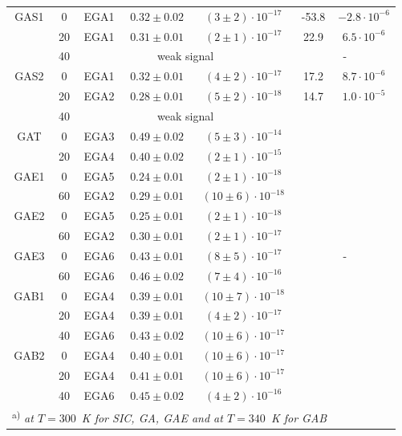 \documentclass[final,3p,times,twocolumn,authoryear]{elsarticle}
\begin{document}
\begin{table}
\begin{tabular}{ccccccc}
GAS1& 0 &EGA1& $0.32\pm0.02$ &$(3\pm2)\cdot10^{-17}$&-53.8&$-2.8\cdot10^{-6}$\\ %
& 20 &EGA1& $0.31\pm0.01$ &$(2\pm1)\cdot10^{-17}$&22.9&$6.5\cdot10^{-6}$\\ %
& 40 & \multicolumn{3}{c}{weak signal}&\multicolumn{2}{c}{-}\\ %
GAS2& 0 &EGA1& $0.32\pm0.01$ &$(4\pm2)\cdot10^{-17}$&17.2&$8.7\cdot10^{-6}$\\ %
& 20 &EGA2& $0.28\pm0.01$ &$(5\pm2)\cdot10^{-18}$&14.7&$1.0\cdot10^{-5}$\\ %
& 40 & \multicolumn{3}{c}{weak signal}&\multicolumn{2}{c}{}\\ %
GAT& 0 &EGA3& $0.49\pm0.02$ &$(5\pm3)\cdot10^{-14}$&\multicolumn{2}{c}{}\\ %
& 20 &EGA4& $0.40\pm0.02$ &$(2\pm1)\cdot10^{-15}$&\multicolumn{2}{c}{}\\ %
GAE1& 0 &EGA5& $0.24\pm0.01$ &$(2\pm1)\cdot10^{-18}$&\multicolumn{2}{c}{}\\ %
& 60 &EGA2& $0.29\pm0.01$ &$(10\pm6)\cdot10^{-18}$&\multicolumn{2}{c}{}\\ %
GAE2& 0 &EGA5& $0.25\pm0.01$ &$(2\pm1)\cdot10^{-18}$&\multicolumn{2}{c}{}\\ %
& 60 &EGA2& $0.30\pm0.01$ &$(2\pm1)\cdot10^{-17}$&\multicolumn{2}{c}{}\\ %
GAE3& 0 &EGA6& $0.43\pm0.01$ &$(8\pm5)\cdot10^{-17}$&\multicolumn{2}{c}{-}\\ %
& 60 &EGA6& $0.46\pm0.02$ &$(7\pm4)\cdot10^{-16}$&\multicolumn{2}{c}{}\\ %
GAB1& 0 &EGA4& $0.39\pm0.01$ &$(10\pm7)\cdot10^{-18}$&\multicolumn{2}{c}{}\\ %
& 20 &EGA4& $0.39\pm0.01$ &$(4\pm2)\cdot10^{-17}$&\multicolumn{2}{c}{}\\ %
& 40 &EGA6& $0.43\pm0.02$ &$(10\pm6)\cdot10^{-17}$&\multicolumn{2}{c}{}\\ %
GAB2& 0 &EGA4& $0.40\pm0.01$ &$(10\pm6)\cdot10^{-17}$&\multicolumn{2}{c}{}\\ %
& 20 &EGA4& $0.41\pm0.01$ &$(10\pm6)\cdot10^{-17}$&\multicolumn{2}{c}{}\\ %
& 40 &EGA6& $0.45\pm0.02$ &$(4\pm2)\cdot10^{-16}$&\multicolumn{2}{c}{}\\  %
\multicolumn{6}{l}{\textsuperscript{ a)} \emph{at $T=300$~K for SIC, GA, GAE and at $T=340$~K for GAB}}\\
\hline
\end{tabular}
\end{table}
\end{document}
